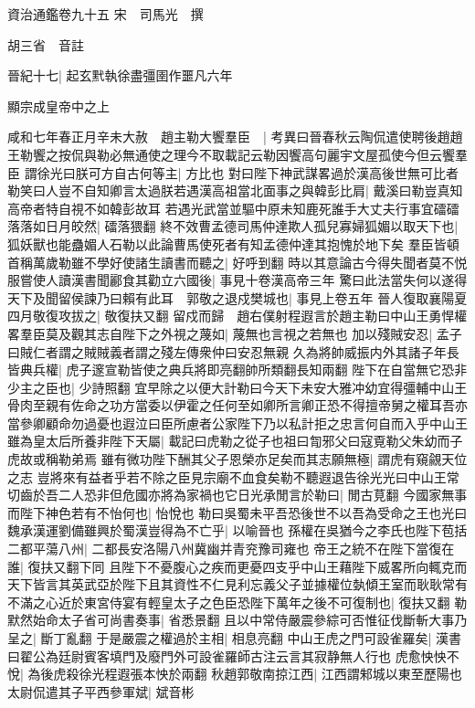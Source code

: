 資治通鑑卷九十五
宋　司馬光　撰

胡三省　音註

晉紀十七|{
	起玄黓執徐盡彊圉作噩凡六年}


顯宗成皇帝中之上

咸和七年春正月辛未大赦　趙主勒大饗羣臣　|{
	考異曰晉春秋云陶侃遣使聘後趙趙王勒饗之按侃與勒必無通使之理今不取載記云勒因饗高句麗宇文屋孤使今但云饗羣臣}
謂徐光曰朕可方自古何等主|{
	方比也}
對曰陛下神武謀畧過於漢高後世無可比者勒笑曰人豈不自知卿言太過朕若遇漢高祖當北面事之與韓彭比肩|{
	戴溪曰勒豈真知高帝者特自視不如韓彭故耳}
若遇光武當並驅中原未知鹿死誰手大丈夫行事宜礌礌落落如日月皎然|{
	礌落猥翻}
終不效曹孟德司馬仲達欺人孤兒寡婦狐媚以取天下也|{
	狐妖獸也能蠱媚人石勒以此論曹馬使死者有知孟德仲達其抱愧於地下矣}
羣臣皆頓首稱萬歲勒雖不學好使諸生讀書而聽之|{
	好呼到翻}
時以其意論古今得失聞者莫不悦服嘗使人讀漢書聞酈食其勸立六國後|{
	事見十卷漢高帝三年}
驚曰此法當失何以遂得天下及聞留侯諫乃曰賴有此耳　郭敬之退戍樊城也|{
	事見上卷五年}
晉人復取襄陽夏四月敬復攻拔之|{
	敬復扶又翻}
留戍而歸　趙右僕射程遐言於趙主勒曰中山王勇悍權畧羣臣莫及觀其志自陛下之外視之蔑如|{
	蔑無也言視之若無也}
加以殘賊安忍|{
	孟子曰賊仁者謂之賊賊義者謂之殘左傳衆仲曰安忍無親}
久為將帥威振内外其諸子年長皆典兵權|{
	虎子邃宣勒皆使之典兵將即亮翻帥所類翻長知兩翻}
陛下在自當無它恐非少主之臣也|{
	少詩照翻}
宜早除之以便大計勒曰今天下未安大雅冲幼宜得彊輔中山王骨肉至親有佐命之功方當委以伊霍之任何至如卿所言卿正恐不得擅帝舅之權耳吾亦當參卿顧命勿過憂也遐泣曰臣所慮者公家陛下乃以私計拒之忠言何自而入乎中山王雖為皇太后所養非陛下天屬|{
	載記曰虎勒之從子也祖曰㔨邪父曰寇覔勒父朱幼而子虎故或稱勒弟焉}
雖有微功陛下酬其父子恩榮亦足矣而其志願無極|{
	謂虎有窺覦天位之志}
豈將來有益者乎若不除之臣見宗廟不血食矣勒不聽遐退告徐光光曰中山王常切齒於吾二人恐非但危國亦將為家禍也它日光承閒言於勒曰|{
	閒古莧翻}
今國家無事而陛下神色若有不怡何也|{
	怡悅也}
勒曰吳蜀未平吾恐後世不以吾為受命之王也光曰魏承漢運劉備雖興於蜀漢豈得為不亡乎|{
	以喻晉也}
孫權在吳猶今之李氏也陛下苞括二都平蕩八州|{
	二都長安洛陽八州冀幽并青兖豫司雍也}
帝王之統不在陛下當復在誰|{
	復扶又翻下同}
且陛下不憂腹心之疾而更憂四支乎中山王藉陛下威畧所向輒克而天下皆言其英武亞於陛下且其資性不仁見利忘義父子並據權位埶傾王室而耿耿常有不滿之心近於東宮侍宴有輕皇太子之色臣恐陛下萬年之後不可復制也|{
	復扶又翻}
勒默然始命太子省可尚書奏事|{
	省悉景翻}
且以中常侍嚴震參綜可否惟征伐斷斬大事乃呈之|{
	斷丁亂翻}
于是嚴震之權過於主相|{
	相息亮翻}
中山王虎之門可設雀羅矣|{
	漢書曰翟公為廷尉賓客填門及廢門外可設雀羅師古注云言其寂静無人行也}
虎愈怏怏不悅|{
	為後虎殺徐光程遐張本怏於兩翻}
秋趙郭敬南掠江西|{
	江西謂邾城以東至歷陽也}
太尉侃遣其子平西參軍斌|{
	斌音彬}
